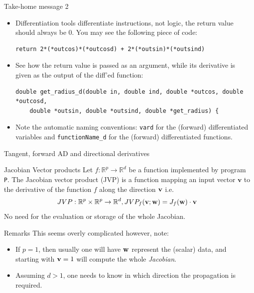 \documentclass[12pt,xcolor={table}]{beamer}
\newcommand{\vbf}{{\bf v}}
\newcommand{\wbf}{{\bf w}}
\begin{document}
\begin{frame}[fragile]{Take-home message 2}
  \begin{itemize}
    \item Differentiation tools differentiate instructions, not logic, the return value should always be 0. You may see the following piece of code: 
    \begin{lstlisting}
return 2*(*outcos)*(*outcosd) + 2*(*outsin)*(*outsind)
    \end{lstlisting}
    \item See how the return value is passed as an argument, while its derivative is given as the output of the diff'ed function:
    \begin{lstlisting}
double get_radius_d(double in, double ind, double *outcos, double *outcosd, 
    double *outsin, double *outsind, double *get_radius) {
    \end{lstlisting}
    \item Note the automatic naming conventions: \texttt{vard} for the (forward) differentiated variables and \texttt{functionName\_d} for the (forward) differentiated functions.
  \end{itemize}
\end{frame}

\begin{frame}{Tangent, forward AD and directional derivatives}
  \begin{block}{Jacobian Vector products}
    Let $f: \mathbb{R}^p \to \mathbb{R}^d$ be a function implemented by program \texttt{P}. 
    The \alert{Jacobian vector product} (JVP) is a function mapping an input vector $\textbf{v}$ to the derivative of the function $f$ along the direction $\vbf$
    i.e.
    $$
    JVP: \mathbb{R}^p \times \mathbb{R}^p \to \mathbb{R}^d, JVP_f(\vbf; \wbf) = J_f(\wbf) \cdot \vbf
    $$
    No need for the evaluation or storage of the whole Jacobian.
  \end{block}
  
  \begin{block}{Remarks}
    This seems overly complicated however, note: 
    \begin{itemize}
      \item If $p = 1$, then usually one will have $\wbf$ represent the (scalar) data, and starting with $\vbf = 1$ will compute the whole \emph{Jacobian}.
      \item Assuming $d > 1$, one needs to know in which direction the propagation is required.
    \end{itemize}
  \end{block}
\end{frame}
\end{document}
